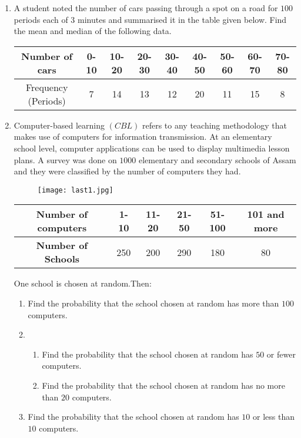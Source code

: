 \documentclass[12pt,-letter paper]{article}
\providecommand{\brak}[1]{\ensuremath{\left(#1\right)}}
\begin{document}
\begin{enumerate}
\item A student noted the number of cars passing through a spot on a road for $100$ periods each of $3$ minutes and summarised it in the table given below. Find the mean and median of the following data.\\

	\begin{tabular}{|c|c|c|c|c|c|c|c|c|}
\hline
Number of cars & 0-10 & 10-20 & 20-30 & 30-40 & 40-50 & 50-60 & 60-70 & 70-80\\ 
\hline
Frequency (Periods) & 7 & 14 & 13 & 12 & 20 & 11 & 15 & 8\\ 
\hline

\end{tabular}

\item Computer-based learning $\brak{CBL}$ refers to any teaching methodology that makes use of computers for information transmission. At an elementary school level, computer applications can be used to display multimedia lesson plans. A survey was done on $1000$ elementary and secondary schools of Assam and they were classified by the number of computers they had.

	\begin{figure}[!ht]
		\centering
		\texttt{[image: last1.jpg]}
		\caption{}
		\label{fig:enter-label}
	\end{figure}

	\begin{center}
	\begin{tabular}{|c|c|c|c|c|c|}
	\hline
	\textbf{Number of computers} & 1-10 & 11-20 & 21-50 &  51-100 & 101 and more \\
	\hline
	\textbf{Number of Schools} & 250 & 200 & 290 & 180 & 80 \\
	\hline
	\end{tabular}
	\end{center}

	\text One school is chosen at random.Then:
	\begin{enumerate}
		\item  Find the probability that the school chosen at random has more than $100$ computers.
		\item
		\begin{enumerate}
			\item  Find the probability that the school chosen at random has $50$ or fewer computers.
			\item  Find the probability that the school chosen at random has no more than $20$ computers.
		\end{enumerate}
		\item  Find the probability that the school chosen at random has $10$ or less than $10$ computers.
	\end{enumerate}


\end{enumerate}
\end{document}
